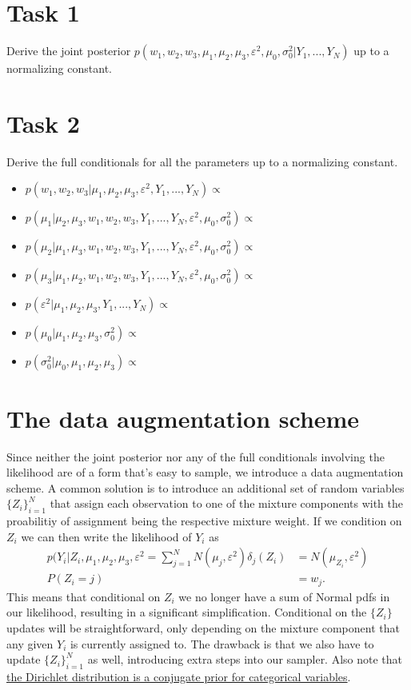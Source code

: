 \documentclass{article}
\begin{document}
\section*{Task 1}

Derive the joint posterior $p(w_1,w_2,w_3,\mu_1,\mu_2,\mu_3,\varepsilon^2,\mu_0,\sigma_0^2|Y_1,...,Y_N)$ up to a normalizing constant.

\section*{Task 2}

Derive the full conditionals for all the parameters up to a normalizing constant.
\begin{itemize}
\item $p(w_1,w_2,w_3|\mu_1,\mu_2,\mu_3,\varepsilon^2,Y_1,...,Y_N) \propto$
\item $p(\mu_1|\mu_2,\mu_3,w_1,w_2,w_3,Y_1,...,Y_N,\varepsilon^2,\mu_0,\sigma_0^2) \propto$
\item $p(\mu_2|\mu_1,\mu_3,w_1,w_2,w_3,Y_1,...,Y_N,\varepsilon^2,\mu_0,\sigma_0^2) \propto$
\item $p(\mu_3|\mu_1,\mu_2,w_1,w_2,w_3,Y_1,...,Y_N,\varepsilon^2,\mu_0,\sigma_0^2) \propto$
\item $p(\varepsilon^2|\mu_1,\mu_2,\mu_3,Y_1,...,Y_N) \propto$
\item $p(\mu_0|\mu_1,\mu_2,\mu_3,\sigma_0^2) \propto$
\item $p(\sigma_0^2|\mu_0,\mu_1,\mu_2,\mu_3) \propto$
\end{itemize}

\section*{The data augmentation scheme}

Since neither the joint posterior nor any of the full conditionals involving the likelihood are of a form that's easy to sample, we introduce a data augmentation scheme. A common solution is to introduce an additional set of random variables ${\{Z_i\}}_{i=1}^N$ that assign each observation to one of the mixture components with the proabilitiy of assignment being the respective mixture weight. If we condition on $Z_i$ we can then write the likelihood of $Y_i$ as
\begin{align*} 
p(Y_i|Z_i,\mu_1,\mu_2,\mu_3,\varepsilon^2 = \sum_{j=1}^N N(\mu_j,\varepsilon^2)\delta_{j}(Z_i) &= N(\mu_{Z_i},\varepsilon^2) \\
P(Z_i = j ) &= w_j.
\end{align*}
This means that conditional on $Z_i$ we no longer have a sum of Normal pdfs in our likelihood, resulting in a significant simplification. Conditional on the $\{Z_i\}$ updates will be straightforward, only depending on the mixture component that any given $Y_i$ is currently assigned to. The drawback is that we also have to update ${\{Z_i\}}_{i=1}^N$ as well, introducing extra steps into our sampler. Also note that \href{https://en.wikipedia.org/wiki/Dirichlet_distribution#Conjugate_to_categorical.2Fmultinomial}{the Dirichlet distribution is a conjugate prior for categorical variables}. 
\end{document}
